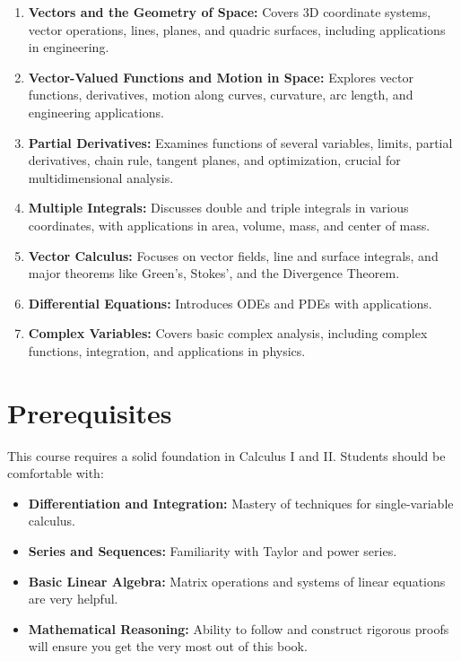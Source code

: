 \begin{enumerate}
    \item \textbf{Vectors and the Geometry of Space:} Covers 3D coordinate systems, vector operations, lines, planes, and quadric surfaces, including applications in engineering.
    \item \textbf{Vector-Valued Functions and Motion in Space:} Explores vector functions, derivatives, motion along curves, curvature, arc length, and engineering applications.
    \item \textbf{Partial Derivatives:} Examines functions of several variables, limits, partial derivatives, chain rule, tangent planes, and optimization, crucial for multidimensional analysis.
    \item \textbf{Multiple Integrals:} Discusses double and triple integrals in various coordinates, with applications in area, volume, mass, and center of mass.
    \item \textbf{Vector Calculus:} Focuses on vector fields, line and surface integrals, and major theorems like Green’s, Stokes’, and the Divergence Theorem.
    \item \textbf{Differential Equations:} Introduces ODEs and PDEs with applications.
    \item \textbf{Complex Variables:} Covers basic complex analysis, including complex functions, integration, and applications in physics.

\end{enumerate}

\section*{Prerequisites}
This course requires a solid foundation in Calculus I and II. Students should be comfortable with:

\begin{itemize}
    \item \textbf{Differentiation and Integration:} Mastery of techniques for single-variable calculus.
    \item \textbf{Series and Sequences:} Familiarity with Taylor and power series.
    \item \textbf{Basic Linear Algebra:} Matrix operations and systems of linear equations are very helpful.
    \item \textbf{Mathematical Reasoning:} Ability to follow and construct rigorous proofs will ensure you get the very most out of this book.
\end{itemize}

